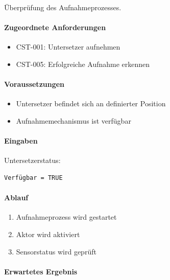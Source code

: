 \documentclass[
  a4paper,
  12pt,
  DIV=12,        %
  parskip=half,  %
  headings=small %
]{scrartcl}
\theoremstyle{definition}
\providecommand{\tightlist}{%
  \setlength{\itemsep}{0pt}\setlength{\parskip}{0pt}}
\theoremstyle{definition}
\begin{document}
Überprüfung des Aufnahmeprozesses.

\paragraph{Zugeordnete Anforderungen}\label{zugeordnete-anforderungen-5}

\begin{itemize}
\tightlist
\item
  CST-001: Untersetzer aufnehmen
\item
  CST-005: Erfolgreiche Aufnahme erkennen
\end{itemize}

\paragraph{Voraussetzungen}\label{voraussetzungen-5}

\begin{itemize}
\tightlist
\item
  Untersetzer befindet sich an definierter Position
\item
  Aufnahmemechanismus ist verfügbar
\end{itemize}

\paragraph{Eingaben}\label{eingaben-5}

Untersetzerstatus:

\begin{verbatim}
Verfügbar = TRUE
\end{verbatim}

\paragraph{Ablauf}\label{ablauf-5}

\begin{enumerate}
\def\labelenumi{\arabic{enumi}.}
\tightlist
\item
  Aufnahmeprozess wird gestartet
\item
  Aktor wird aktiviert
\item
  Sensorstatus wird geprüft
\end{enumerate}

\paragraph{Erwartetes Ergebnis}\label{erwartetes-ergebnis-5}
\end{document}
